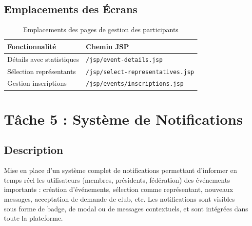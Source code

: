 \documentclass[12pt,a4paper]{article}
\begin{document}
\subsection{Emplacements des Écrans}

\begin{table}[h]
\centering
\begin{tabular}{ll}
\toprule
\textbf{Fonctionnalité} & \textbf{Chemin JSP} \\
\midrule
Détails avec statistiques & \texttt{/jsp/event-details.jsp} \\
Sélection représentants & \texttt{/jsp/select-representatives.jsp} \\
Gestion inscriptions & \texttt{/jsp/events/inscriptions.jsp} \\
\bottomrule
\end{tabular}
\caption{Emplacements des pages de gestion des participants}
\end{table}


\section{Tâche 5 : Système de Notifications}

\subsection{Description}
Mise en place d'un système complet de notifications permettant d'informer en temps réel les utilisateurs (membres, présidents, fédération) des événements importants : création d'événements, sélection comme représentant, nouveaux messages, acceptation de demande de club, etc. Les notifications sont visibles sous forme de badge, de modal ou de messages contextuels, et sont intégrées dans toute la plateforme.
\end{document}
